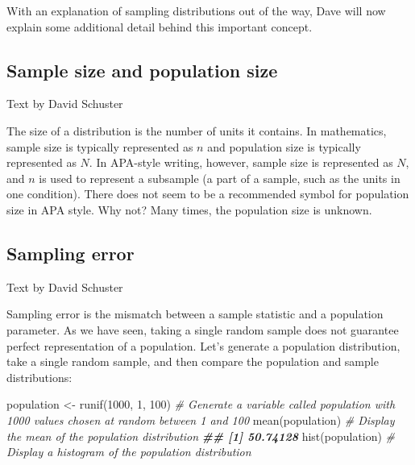 \documentclass[
]{book}
\newenvironment{Shaded}{\begin{snugshade}}{\end{snugshade}}
\newcommand{\CommentTok}[1]{\textcolor[rgb]{0.56,0.35,0.01}{\textit{#1}}}
\newcommand{\DecValTok}[1]{\textcolor[rgb]{0.00,0.00,0.81}{#1}}
\newcommand{\DocumentationTok}[1]{\textcolor[rgb]{0.56,0.35,0.01}{\textbf{\textit{#1}}}}
\newcommand{\FunctionTok}[1]{\textcolor[rgb]{0.00,0.00,0.00}{#1}}
\newcommand{\NormalTok}[1]{#1}
\newcommand{\OtherTok}[1]{\textcolor[rgb]{0.56,0.35,0.01}{#1}}
\begin{document}
With an explanation of sampling distributions out of the way, Dave will now explain some additional detail behind this important concept.

\hypertarget{sample-size-and-population-size}{%
\subsection{Sample size and population size}\label{sample-size-and-population-size}}

Text by David Schuster

The size of a distribution is the number of units it contains. In mathematics, sample size is typically represented as \(n\) and population size is typically represented as \(N\). In APA-style writing, however, sample size is represented as \(N\), and \(n\) is used to represent a subsample (a part of a sample, such as the units in one condition). There does not seem to be a recommended symbol for population size in APA style. Why not? Many times, the population size is unknown.

\hypertarget{sampling-error}{%
\subsection{Sampling error}\label{sampling-error}}

Text by David Schuster

Sampling error is the mismatch between a sample statistic and a population parameter. As we have seen, taking a single random sample does not guarantee perfect representation of a population. Let's generate a population distribution, take a single random sample, and then compare the population and sample distributions:

\begin{Shaded}
\begin{Highlighting}[]
\NormalTok{population }\OtherTok{\textless{}{-}} \FunctionTok{runif}\NormalTok{(}\DecValTok{1000}\NormalTok{, }\DecValTok{1}\NormalTok{, }\DecValTok{100}\NormalTok{) }\CommentTok{\# Generate a variable called \textquotesingle{}population\textquotesingle{} with 1000 values chosen at random between 1 and 100}
\FunctionTok{mean}\NormalTok{(population) }\CommentTok{\# Display the mean of the population distribution}
\DocumentationTok{\#\# [1] 50.74128}
\FunctionTok{hist}\NormalTok{(population) }\CommentTok{\# Display a histogram of the population distribution}
\end{Highlighting}
\end{Shaded}
\end{document}

